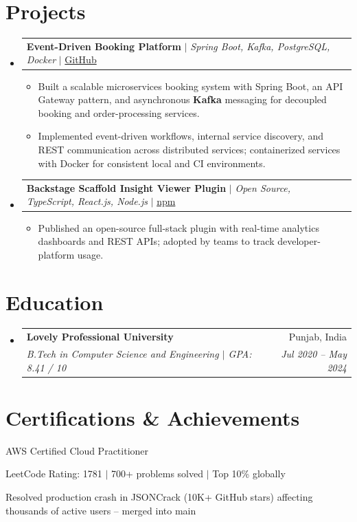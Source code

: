 \documentclass[letterpaper,10.5pt]{article}
\makeatletter
\newcommand{\resumeItem}[1]{
  \item\small{#1\vspace{-3pt}}
}
\newcommand{\resumeSubheading}[4]{
  \vspace{-2pt}\item
    \begin{tabular*}{0.97\textwidth}[t]{l@{\extracolsep{\fill}}r}
      \textbf{#1} & \small #2 \\
      \textit{\small#3} & \textit{\small #4} \\
    \end{tabular*}\vspace{-4pt}
}
\newcommand{\resumeProjectHeading}[2]{
  \item
    \begin{tabular*}{0.97\textwidth}{l@{\extracolsep{\fill}}r}
      \small#1 & \small #2 \\
    \end{tabular*}\vspace{-6pt}
}
\newcommand{\resumeSubHeadingListStart}{\begin{itemize}[leftmargin=0.15in, label={}]}
\newcommand{\resumeSubHeadingListEnd}{\end{itemize}}
\newcommand{\resumeItemListStart}{\begin{itemize}[leftmargin=0.2in]\vspace{-2pt}}
\newcommand{\resumeItemListEnd}{\end{itemize}\vspace{-3pt}}
\makeatother
\begin{document}
\section{Projects}
\resumeSubHeadingListStart

  \resumeProjectHeading
    {\textbf{Event-Driven Booking Platform} $|$ \textit{Spring Boot, Kafka, PostgreSQL, Docker} $|$ \href{https://github.com/Prateek-Wayne/event-booking-system}{GitHub}}{}
    \resumeItemListStart
      \resumeItem{Built a scalable microservices booking system with Spring Boot, an API Gateway pattern, and asynchronous \textbf{Kafka} messaging for decoupled booking and order-processing services.}
      \resumeItem{Implemented event-driven workflows, internal service discovery, and REST communication across distributed services; containerized services with Docker for consistent local and CI environments.}
    \resumeItemListEnd

  \vspace{6pt}
  \resumeProjectHeading
    {\textbf{Backstage Scaffold Insight Viewer Plugin} $|$ \textit{Open Source, TypeScript, React.js, Node.js} $|$ \href{https://www.npmjs.com/package/@prateek-wayne/backstage-plugin-scaffold-insight}{npm}}{}
    \resumeItemListStart
      \resumeItem{Published an open-source full-stack plugin with real-time analytics dashboards and REST APIs; adopted by teams to track developer-platform usage.}
    \resumeItemListEnd

\resumeSubHeadingListEnd

\section{Education}
\resumeSubHeadingListStart
  \resumeSubheading
    {Lovely Professional University}{Punjab, India}
    {B.Tech in Computer Science and Engineering \textnormal{$|$ GPA: 8.41 / 10}}{Jul 2020 -- May 2024}
\resumeSubHeadingListEnd

\section{Certifications \& Achievements}
\begin{itemize}[leftmargin=0.15in, label={}, itemsep=0pt]
  \small{
    \item AWS Certified Cloud Practitioner
    \item LeetCode Rating: 1781 $|$ 700+ problems solved $|$ Top 10\% globally
    \item Resolved production crash in JSONCrack (10K+ GitHub stars) affecting thousands of active users -- merged into main
  }
\end{itemize}
\end{document}
